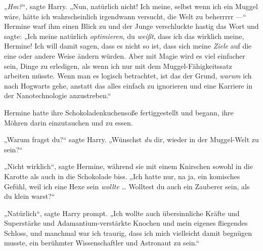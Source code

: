 „\emph{Hm?}“, sagte Harry.
„Nun, natürlich nicht! Ich meine, selbst wenn ich ein Muggel wäre, hätte ich wahrscheinlich irgendwann versucht, die Welt zu beherrrrr —“ Hermine warf ihm einen Blick zu und der Junge verschluckte hastig das Wort und sagte:
„Ich meine natürlich \emph{optimieren}, du \emph{weißt}, dass ich das wirklich meine, Hermine! Ich will damit sagen, dass es nicht so ist, dass sich meine \emph{Ziele} auf die eine oder andere Weise ändern würden. Aber mit Magie wird es viel einfacher sein, Dinge zu erledigen, als wenn ich nur mit dem Muggel-Fähigkeitssatz arbeiten müsste. Wenn man es logisch betrachtet, ist das der Grund, \emph{warum} ich nach Hogwarts gehe, anstatt das alles einfach zu ignorieren und eine Karriere in der Nanotechnologie anzustreben.“

Hermine hatte ihre Schokoladenkuchensoße fertiggestellt und begann, ihre Möhren darin einzutauchen und zu essen.

„Warum fragst du?“ sagte Harry.
„Wünschst \emph{du} dir, wieder in der Muggel-Welt zu sein?“

„Nicht wirklich“, sagte Hermine, während sie mit einem Knirschen sowohl in die Karotte als auch in die Schokolade biss.
„Ich hatte nur, na ja, ein komisches Gefühl, weil ich eine Hexe sein \emph{wollte} … Wolltest du auch ein Zauberer sein, als du klein warst?“

„Natürlich“, sagte Harry prompt.
„Ich wollte auch übersinnliche Kräfte und Superstärke und Adamantium-verstärkte Knochen und mein eigenes fliegendes Schloss, und manchmal war ich traurig, dass ich mich vielleicht damit begnügen musste, ein berühmter Wissenschaftler und Astronaut zu sein.“

